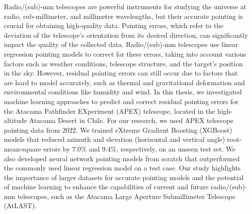 

Radio/(sub)-mm telescopes are powerful instruments for studying the universe at radio, sub-millimeter, and millimeter wavelengths, but their accurate pointing is crucial for obtaining high-quality data.
Pointing errors, which refer to the deviation of the telescope's orientation from its desired direction, can significantly impact the quality of the collected data.
Radio/(sub)-mm telescopes use linear regression pointing models to correct for these errors, taking into account various factors such as weather conditions, telescope structure, and the target's position in the sky.
However, residual pointing errors can still occur due to factors that are hard to model accurately, such as thermal and gravitational deformation and environmental conditions like humidity and wind.
In this thesis, we investigated machine learning approaches to predict and correct residual pointing errors for the Atacama Pathfinder EXperiment (APEX) telescope, located in the high-altitude Atacama Desert in Chile.
For our research, we used APEX telescope pointing data from $2022$.
We trained eXtreme Gradient Boosting (XGBoost) models that reduced azimuth and elevation (horizontal and vertical angle) root-mean-square errors by $7.0\%$ and $9.4\%$,
respectively, on an unseen test set. We also developed neural network pointing models from scratch that outperformed the commonly used linear regression model on a test case.
Our study highlights the importance of larger datasets for accurate pointing models and the potential of machine learning to enhance the capabilities of current and future radio/(sub)-mm telescopes,
such as the Atacama Large Aperture Submillimeter Telescope (AtLAST).


